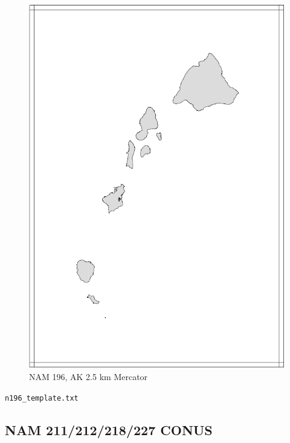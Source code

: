 \documentclass[11pt]{article}   %
\begin{document}
\begin{figure}[htbp]\begin{center}
 \includegraphics[angle=-90,scale=1.0]{Figs/n196.pdf}
\parbox{15cm}{\caption{\label{FigNAM196}
NAM 196, AK 2.5 km Mercator
}}
\end{center}\end{figure}
\clearpage
\verb|n196_template.txt| \\
\tiny  \normalsize

\clearpage
\subsection{NAM 211/212/218/227 CONUS}
\end{document}
